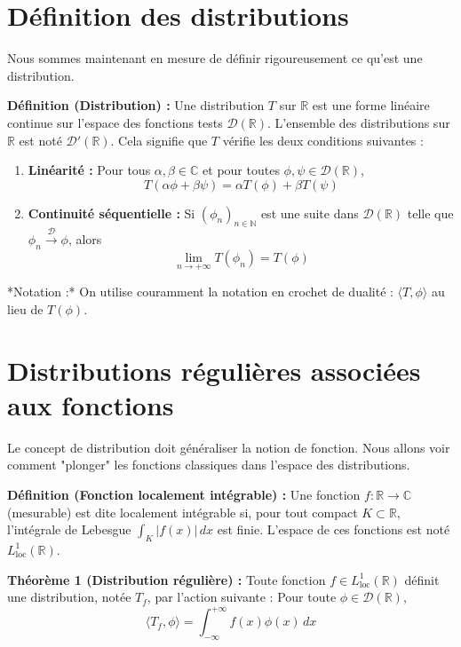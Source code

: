 \documentclass[11pt,a4paper]{article}
\begin{document}
\section{Définition des distributions}

Nous sommes maintenant en mesure de définir rigoureusement ce qu'est une distribution.

\textbf{Définition (Distribution) :} Une distribution $T$ sur $\mathbb{R}$ est une forme linéaire continue sur l'espace des fonctions tests $\mathcal{D}(\mathbb{R})$.
L'ensemble des distributions sur $\mathbb{R}$ est noté $\mathcal{D}'(\mathbb{R})$.
Cela signifie que $T$ vérifie les deux conditions suivantes :
\begin{enumerate}
\item \textbf{Linéarité :} Pour tous $\alpha, \beta \in \mathbb{C}$ et pour toutes $\phi, \psi \in \mathcal{D}(\mathbb{R})$,
   $$T(\alpha \phi + \beta \psi) = \alpha T(\phi) + \beta T(\psi)$$
\item \textbf{Continuité séquentielle :} Si $(\phi_n)_{n \in \mathbb{N}}$ est une suite dans $\mathcal{D}(\mathbb{R})$ telle que $\phi_n \xrightarrow{\mathcal{D}} \phi$, alors
   $$\lim_{n \to +\infty} T(\phi_n) = T(\phi)$$
\end{enumerate}

*Notation :* On utilise couramment la notation en crochet de dualité : $\langle T, \phi \rangle$ au lieu de $T(\phi)$.

\section{Distributions régulières associées aux fonctions}

Le concept de distribution doit généraliser la notion de fonction. Nous allons voir comment "plonger" les fonctions classiques dans l'espace des distributions.

\textbf{Définition (Fonction localement intégrable) :} Une fonction $f : \mathbb{R} \to \mathbb{C}$ (mesurable) est dite localement intégrable si, pour tout compact $K \subset \mathbb{R}$, l'intégrale de Lebesgue $\int_K |f(x)| \, dx$ est finie.
L'espace de ces fonctions est noté $L^1_{\text{loc}}(\mathbb{R})$.

\textbf{Théorème 1 (Distribution régulière) :} Toute fonction $f \in L^1_{\text{loc}}(\mathbb{R})$ définit une distribution, notée $T_f$, par l'action suivante :
Pour toute $\phi \in \mathcal{D}(\mathbb{R})$,
$$\langle T_f, \phi \rangle = \int_{-\infty}^{+\infty} f(x) \phi(x) \, dx$$
\end{document}
